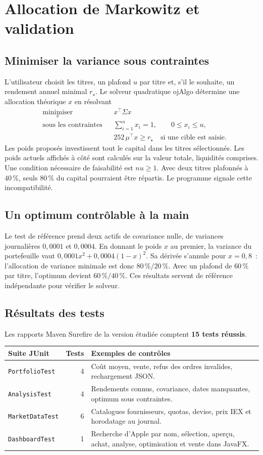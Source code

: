 \documentclass[11pt,a4paper]{article}
\newcommand{\code}[1]{\texttt{#1}}
\newcommand{\rubrique}[1]{\section*{\textcolor{foret}{#1}}}
\begin{document}
\newpage
\rubrique{Allocation de Markowitz et validation}

\subsection*{Minimiser la variance sous contraintes}
L'utilisateur choisit les titres, un plafond $u$ par titre et, s'il le souhaite, un rendement annuel minimal $r_\star$. Le solveur quadratique ojAlgo détermine une allocation théorique $x$ en résolvant
\[
\begin{aligned}
  &\underset{x}{\operatorname{minimiser}} && x^\top\Sigma x \\
  &\text{sous les contraintes} && \sum_{i=1}^{n} x_i=1,\qquad 0\leq x_i\leq u, \\
  & && 252\,\mu^\top x\geq r_\star \quad \text{si une cible est saisie.}
\end{aligned}
\]
Les poids proposés investissent tout le capital dans les titres sélectionnés. Les poids actuels affichés à côté sont calculés sur la valeur totale, liquidités comprises. Une condition nécessaire de faisabilité est $nu\geq1$. Avec deux titres plafonnés à $40\,\%$, seuls $80\,\%$ du capital pourraient être répartis. Le programme signale cette incompatibilité.

\subsection*{Un optimum contrôlable à la main}
Le test de référence prend deux actifs de covariance nulle, de variances journalières $0{,}0001$ et $0{,}0004$. En donnant le poids $x$ au premier, la variance du portefeuille vaut $0{,}0001x^2+0{,}0004(1-x)^2$. Sa dérivée s'annule pour $x=0{,}8$~: l'allocation de variance minimale est donc $80\,\%/20\,\%$. Avec un plafond de $60\,\%$ par titre, l'optimum devient $60\,\%/40\,\%$. Ces résultats servent de référence indépendante pour vérifier le solveur.

\subsection*{Résultats des tests}
Les rapports Maven Surefire de la version étudiée comptent \textbf{15 tests réussis}.

\begin{tabularx}{\linewidth}{@{}lrY@{}}
\toprule
Suite JUnit & Tests & Exemples de contrôles \\
\midrule
\code{PortfolioTest} & 4 & Coût moyen, vente, refus des ordres invalides, rechargement JSON. \\
\code{AnalysisTest} & 4 & Rendements connus, covariance, dates manquantes, optimum sous contraintes. \\
\code{MarketDataTest} & 6 & Catalogues fournisseurs, quotas, devise, prix IEX et horodatage au journal. \\
\code{DashboardTest} & 1 & Recherche d'Apple par nom, sélection, aperçu, achat, analyse, optimisation et vente dans JavaFX. \\
\bottomrule
\end{tabularx}
\end{document}
